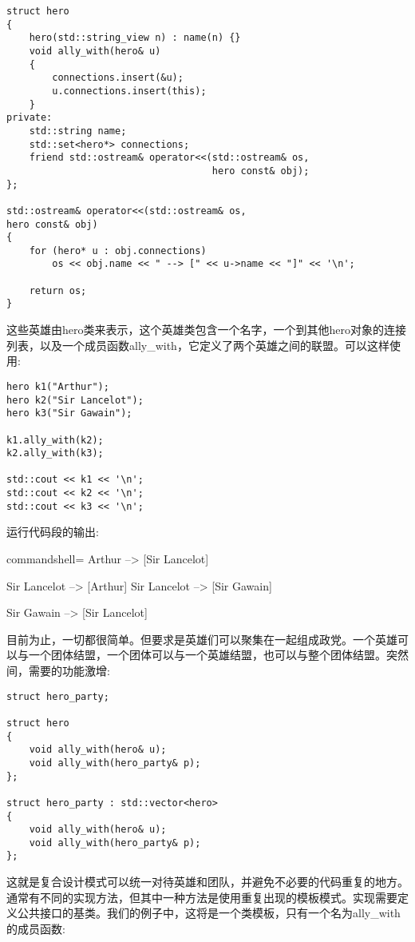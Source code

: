 \begin{lstlisting}[style=styleCXX]
struct hero
{
	hero(std::string_view n) : name(n) {}
	void ally_with(hero& u)
	{
		connections.insert(&u);
		u.connections.insert(this);
	}
private:
	std::string name;
	std::set<hero*> connections;
	friend std::ostream& operator<<(std::ostream& os,
									hero const& obj);
};

std::ostream& operator<<(std::ostream& os,
hero const& obj)
{
	for (hero* u : obj.connections)
		os << obj.name << " --> [" << u->name << "]" << '\n';
		
	return os;
}
\end{lstlisting}

这些英雄由hero类来表示，这个英雄类包含一个名字，一个到其他hero对象的连接列表，以及一个成员函数ally\_with，它定义了两个英雄之间的联盟。可以这样使用:

\begin{lstlisting}[style=styleCXX]
hero k1("Arthur");
hero k2("Sir Lancelot");
hero k3("Sir Gawain");

k1.ally_with(k2);
k2.ally_with(k3);

std::cout << k1 << '\n';
std::cout << k2 << '\n';
std::cout << k3 << '\n';
\end{lstlisting}

运行代码段的输出:

\begin{tcblisting}{commandshell={}}
Arthur --> [Sir Lancelot]

Sir Lancelot --> [Arthur]
Sir Lancelot --> [Sir Gawain]

Sir Gawain --> [Sir Lancelot]
\end{tcblisting}

目前为止，一切都很简单。但要求是英雄们可以聚集在一起组成政党。一个英雄可以与一个团体结盟，一个团体可以与一个英雄结盟，也可以与整个团体结盟。突然间，需要的功能激增:

\begin{lstlisting}[style=styleCXX]
struct hero_party;

struct hero
{
	void ally_with(hero& u);
	void ally_with(hero_party& p);
};

struct hero_party : std::vector<hero>
{
	void ally_with(hero& u);
	void ally_with(hero_party& p);
};
\end{lstlisting}

这就是复合设计模式可以统一对待英雄和团队，并避免不必要的代码重复的地方。通常有不同的实现方法，但其中一种方法是使用重复出现的模板模式。实现需要定义公共接口的基类。我们的例子中，这将是一个类模板，只有一个名为ally\_with的成员函数:

